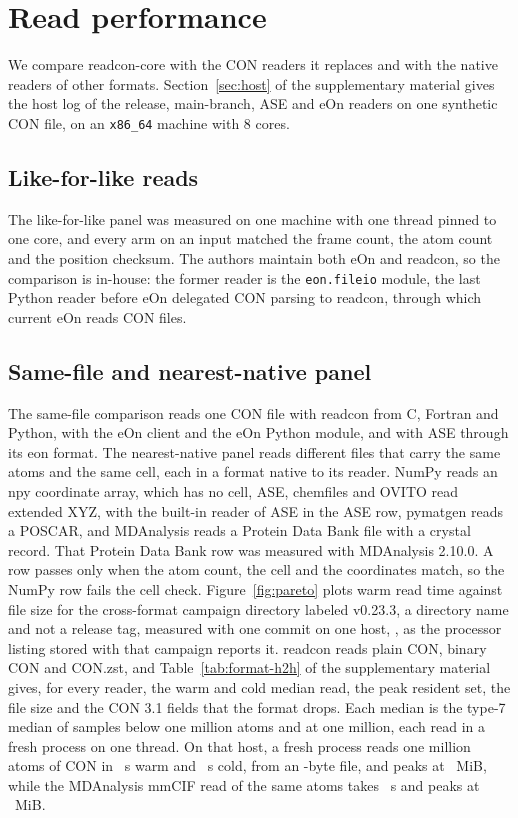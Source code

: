 \documentclass[preprint,12pt]{elsarticle}
\begin{document}
\section{Read performance}\label{sec:performance} We compare readcon-core with the CON readers it replaces and with the native readers of other formats.
Section~\ref*{sec:host} of the supplementary material gives the host log of the release, main-branch, ASE and eOn readers on one synthetic CON file, on an \texttt{x86\_64} machine with 8 cores.

\subsection{Like-for-like reads}\label{sec:like}
The like-for-like panel was measured on one machine with one thread pinned to one core, and every arm on an input matched the frame count, the atom count and the position checksum.
The authors maintain both eOn and readcon, so the comparison is in-house: the former reader is the \texttt{eon.fileio} module, the last Python reader before eOn delegated CON parsing to readcon, through which current eOn reads CON files.



\subsection{Same-file and nearest-native panel}\label{sec:h2h}
The same-file comparison reads one CON file with readcon from C, Fortran and Python, with the eOn client and the eOn Python module, and with ASE through its eon format.
The nearest-native panel reads different files that carry the same atoms and the same cell, each in a format native to its reader.
NumPy reads an npy coordinate array, which has no cell, ASE, chemfiles and OVITO read extended XYZ, with the built-in reader of ASE in the ASE row, pymatgen \cite{ongPythonMaterialsGenomics2013} reads a POSCAR, and MDAnalysis reads a Protein Data Bank file with a crystal record.
That Protein Data Bank row was measured with MDAnalysis 2.10.0.
A row passes only when the atom count, the cell and the coordinates match, so the NumPy row fails the cell check.
Figure~\ref{fig:pareto} plots warm read time against file size for the cross-format campaign directory labeled v0.23.3, a directory name and not a release tag, measured with one commit on one host, \hhfHost{}, as the processor listing stored with that campaign reports it.
readcon reads plain CON, binary CON and CON.zst, and Table~\ref*{tab:format-h2h} of the supplementary material gives, for every reader, the warm and cold median read, the peak resident set, the file size and the CON 3.1 fields that the format drops.
Each median is the type-7 median of \hhfSamplesSubOneM{} samples below one million atoms and \hhfSamplesOneM{} at one million, each read in a fresh process on one thread.
On that host, a fresh process reads one million atoms of CON in \hhfReadconConWarmOneM~s warm and \hhfReadconConColdOneM~s cold, from an \hhfReadconConBytesOneM-byte file, and peaks at \hhfReadconConPeakOneM~MiB, while the MDAnalysis mmCIF read of the same atoms takes \hhfMmcifWarmOneM~s and peaks at \hhfMmcifPeakOneM~MiB.
\hhfFrontSentence{}
\end{document}
